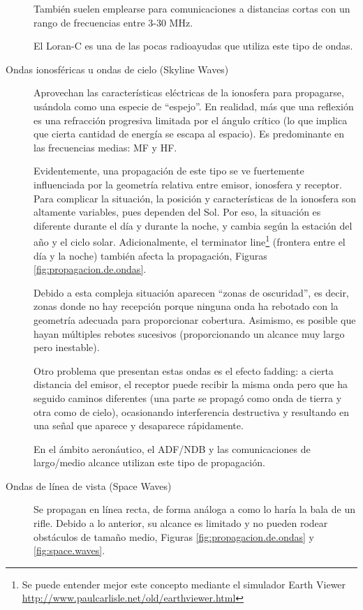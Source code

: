 \begin{description}
Tambi\'en suelen emplearse para comunicaciones a distancias cortas con un rango de frecuencias entre 3-30 MHz.

El Loran-C es una de las pocas radioayudas que utiliza este tipo de ondas. 


\item[Ondas ionosf\'ericas  u ondas de cielo (Skyline Waves)] Aprovechan las caracter\'isticas el\'ectricas de la ionosfera para propagarse, us\'andola como una especie de ``espejo''. En realidad, m\'as que una reflexi\'on es una refracci\'on progresiva limitada por el \'angulo cr\'itico (lo que implica que cierta cantidad de energ\'ia se escapa al espacio). Es predominante en las frecuencias medias: MF y HF.

Evidentemente, una propagaci\'on de este tipo se ve fuertemente influenciada por la geometr\'ia relativa entre emisor, ionosfera y receptor. Para complicar la situaci\'on, la posici\'on y caracter\'isticas de la ionosfera son altamente variables, pues dependen del Sol. Por eso, la situaci\'on es diferente durante el d\'ia y durante la noche, y cambia seg\'un la estaci\'on del a\~no y el ciclo solar. Adicionalmente, el terminator line\footnote{Se puede entender mejor este concepto mediante el simulador Earth Viewer \url{http://www.paulcarlisle.net/old/earthviewer.html} } (frontera entre el d\'ia y la noche) tambi\'en afecta la propagaci\'on,  Figuras \ref{fig:propagacion.de.ondas}.

Debido a esta compleja situaci\'on aparecen ``zonas de oscuridad'', es decir, zonas donde no hay recepci\'on porque ninguna onda ha rebotado con la geometr\'ia adecuada para proporcionar cobertura. Asimismo, es posible que hayan m\'ultiples rebotes sucesivos (proporcionando un alcance muy largo pero inestable).

Otro problema que presentan estas ondas es el efecto fadding: a cierta distancia del emisor, el receptor puede recibir la misma onda pero que ha seguido caminos diferentes (una parte se propag\'o como onda de tierra y otra como de cielo), ocasionando interferencia destructiva y resultando en una se\~nal que aparece y desaparece r\'apidamente.

En el \'ambito aeron\'autico, el ADF/NDB y las comunicaciones de largo/medio alcance utilizan este tipo de propagaci\'on. 


\item[Ondas de l\'inea de vista (Space Waves)] Se propagan en l\'inea recta, de forma an\'aloga a como lo har\'ia la bala de un rifle. Debido a lo anterior, su alcance es limitado y no pueden rodear obst\'aculos de tama\~no medio, Figuras \ref{fig:propagacion.de.ondas} y \ref{fig:space.waves}.


\end{description}
